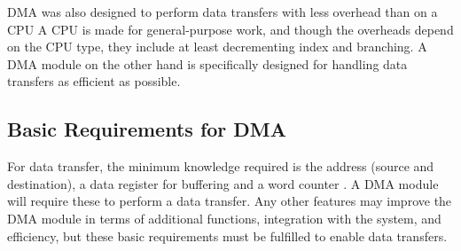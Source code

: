 DMA was also designed to perform data transfers with less overhead than on a CPU \cite{encyclopedia}
A CPU is made for general-purpose work, and though the overheads depend on the CPU type, they include at least decrementing index and branching.
A DMA module on the other hand is specifically designed for handling data transfers as efficient as possible. 

\subsection{Basic Requirements for DMA}
For data transfer, the minimum knowledge required is the address (source and destination), a data register for buffering and a word counter \cite{encyclopedia}.
A DMA module will require these to perform a data transfer.
Any other features may improve the DMA module in terms of additional functions, integration with the system, and efficiency, but these basic requirements must be fulfilled to enable data transfers.


